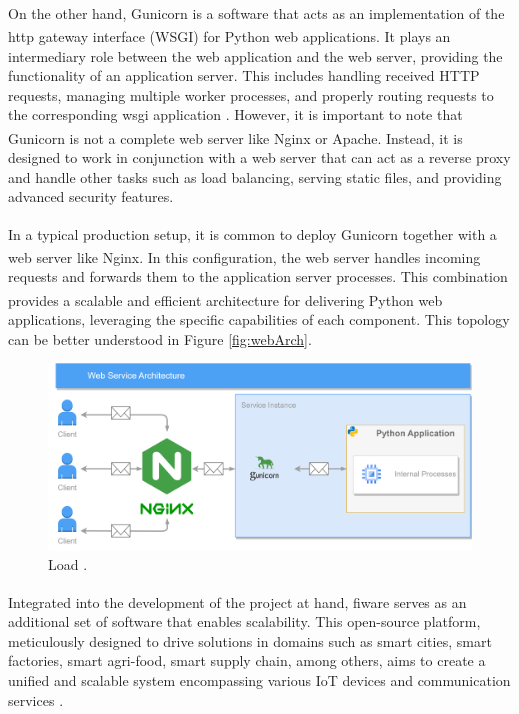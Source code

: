 On the other hand, Gunicorn\textsuperscript{\textregistered} is a software that acts as an implementation of the \acrfull{http} gateway interface (WSGI) for Python\textsuperscript{\textregistered} web applications. It plays an intermediary role between the web application and the web server, providing the functionality of an application server. This includes handling received HTTP requests, managing multiple worker processes, and properly routing requests to the corresponding \acrfull{wsgi} application \cite{chesneau2017gunicorn}. However, it is important to note that Gunicorn\textsuperscript{\textregistered} is not a complete web server like Nginx\textsuperscript{\textregistered} or Apache\textsuperscript{\textregistered}. Instead, it is designed to work in conjunction with a web server that can act as a reverse proxy and handle other tasks such as load balancing, serving static files, and providing advanced security features.

In a typical production setup, it is common to deploy Gunicorn\textsuperscript{\textregistered} together with a web server like Nginx\textsuperscript{\textregistered}. In this configuration, the web server handles incoming requests and forwards them to the application server processes. This combination provides a scalable and efficient architecture for delivering Python\textsuperscript{\textregistered} web applications, leveraging the specific capabilities of each component. This topology can be better understood in Figure \ref{fig:webArch}.

\begin{figure}[ht!]
    \centering
    \includegraphics[width=.65\linewidth]{images/Development/chap4/webArch.png} 
    \caption{Load .}
    \label{fig: webArch}
\end{figure}

Integrated into the development of the project at hand, \acrshort{fiware}\textsuperscript{\textregistered} serves as an additional set of software that enables scalability. This open-source platform, meticulously designed to drive solutions in domains such as smart cities, smart factories, smart agri-food, smart supply chain, among others, aims to create a unified and scalable system encompassing various IoT devices and communication services \cite{fiware}.

